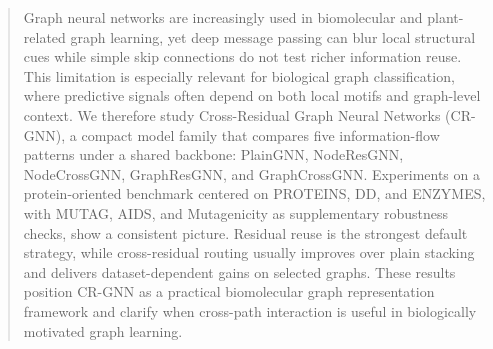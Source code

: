 \begin{abstract}
Graph neural networks are increasingly used in biomolecular and plant-related graph learning, yet deep message passing can blur local structural cues while simple skip connections do not test richer information reuse. This limitation is especially relevant for biological graph classification, where predictive signals often depend on both local motifs and graph-level context. We therefore study Cross-Residual Graph Neural Networks (CR-GNN), a compact model family that compares five information-flow patterns under a shared backbone: PlainGNN, NodeResGNN, NodeCrossGNN, GraphResGNN, and GraphCrossGNN. Experiments on a protein-oriented benchmark centered on PROTEINS, DD, and ENZYMES, with MUTAG, AIDS, and Mutagenicity as supplementary robustness checks, show a consistent picture. Residual reuse is the strongest default strategy, while cross-residual routing usually improves over plain stacking and delivers dataset-dependent gains on selected graphs. These results position CR-GNN as a practical biomolecular graph representation framework and clarify when cross-path interaction is useful in biologically motivated graph learning.
\end{abstract}
